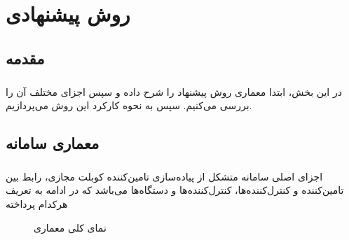
\chapter{روش پیشنهادی} \label{ch:method}
\thispagestyle{empty}

\section{مقدمه}
\paragraph{}{
    در این بخش، ابتدا معماری روش پیشنهاد را شرح داده و سپس اجزای مختلف آن را بررسی می‌کنیم. سپس به نحوه کارکرد این روش می‌پردازیم.
}

\section{معماری سامانه}
\paragraph{}{
    اجزای اصلی سامانه متشکل از پیاده‌سازی تامین‌کننده کوبلت مجازی، رابط بین تامین‌کننده و کنترل‌کننده‌ها، کنترل‌کننده‌ها و دستگاه‌ها می‌باشد که در ادامه به تعریف هرکدام پرداخته
    \begin{figure}[H]
        \caption{نمای کلی معماری}
        \label{fig:arch}
    \end{figure}
}
